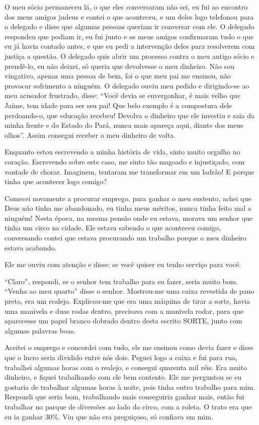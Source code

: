 O meu sócio permaneceu lá, o que eles conversaram não sei, eu fui ao
encontro dos meus amigos judeus e contei o que aconteceu, e um deles
logo telefonou para o delegado e disse que algumas pessoas queriam ir
conversar com ele. O delegado respondeu que podiam ir, eu fui junto e os
meus amigos confirmaram tudo o que eu já havia contado antes, e que eu
pedi a intervenção deles para resolverem com justiça a questão. O
delegado quis abrir um processo contra o meu antigo sócio e prendê-lo,
eu não deixei, só queria que devolvesse o meu dinheiro. Não sou
vingativo, apenas uma pessoa de bem, foi o que meu pai me ensinou, não
provocar sofrimento a ninguém. O delegado ouviu meu pedido e
dirigindo-se ao meu acusador frustrado, disse: ``Você devia se
envergonhar, é mais velho que Jaime, tem idade para ser seu pai! Que
belo exemplo é a compostura dele perdoando-o, que educação recebeu!
Devolva o dinheiro que ele investiu e saia da minha frente e do Estado
do Pará, nunca mais apareça aqui, diante dos meus olhos''. Assim
consegui receber o meu dinheiro de volta.

Enquanto estou escrevendo a minha história de vida, sinto muito orgulho
no coração. Escrevendo sobre este caso, me sinto tão magoado e
injustiçado, com vontade de chorar. Imaginem, tentaram me transformar em
um ladrão! E porque tinha que acontecer logo comigo?

Comecei novamente a procurar emprego, para ganhar o meu sustento, achei
que Deus não tinha me abandonado, eu tinha meus méritos, nunca tinha
feito mal a ninguém! Nesta época, na mesma pensão onde eu estava, morava
um senhor que tinha um circo na cidade. Ele estava sabendo o que
aconteceu comigo, conversando contei que estava procurando um trabalho
porque o meu dinheiro estava acabando.

Ele me ouviu com atenção e disse: se você quiser eu tenho serviço para
você.

``Claro'', respondi, se o senhor tem trabalho para eu fazer, seria muito
bom. ``Venha ao meu quarto'' disse o senhor. Mostrou-me uma caixa
revestida de pano preto, era um realejo. Explicou-me que era uma máquina
de tirar a sorte, havia uma manivela e duas rodas dentro, precisava com
a manivela rodar, para que aparecesse um papel branco dobrado dentro
desta escrito SORTE, junto com algumas palavras boas.

Aceitei o emprego e concordei com tudo, ele me ensinou como devia fazer
e disse que o lucro seria dividido entre nós dois. Peguei logo a caixa e
fui para rua, trabalhei algumas horas com o realejo, e consegui quarenta
mil réis. Era muito dinheiro, e fiquei trabalhando com ele bem contente.
Ele me perguntou se eu gostaria de trabalhar algumas horas à noite, pois
tinha outro trabalho para mim. Respondi que seria bom, trabalhando mais
conseguiria ganhar mais, então fui trabalhar no parque de diversões ao
lado do circo, com a roleta. O trato era que eu ia ganhar 30\%. Viu que
não era preguiçoso, só confiava em mim.

